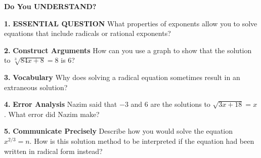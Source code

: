 \documentclass{article}
\newenvironment{practice}[2]{\noindent\textbf{#1.}}{}
\begin{document}
\vspace{1em}

\begin{minipage}[t]{0.45\textwidth}
\textbf{\large Do You UNDERSTAND?}

\begin{practice}{1}{}
\textbf{ESSENTIAL QUESTION} What properties of exponents allow you to solve equations that include radicals or rational exponents?
\end{practice}

\begin{practice}{2}{}
\textbf{Construct Arguments} How can you use a graph to show that the solution to $\sqrt[3]{84x + 8} = 8$ is 6?
\end{practice}

\begin{practice}{3}{}
\textbf{Vocabulary} Why does solving a radical equation sometimes result in an extraneous solution?
\end{practice}

\begin{practice}{4}{}
\textbf{Error Analysis} Nazim said that $-3$ and $6$ are the solutions to $\sqrt{3x + 18} = x$. What error did Nazim make?
\end{practice}

\begin{practice}{5}{}
\textbf{Communicate Precisely} Describe how you would solve the equation $x^{2/3} = n$. How is this solution method to be interpreted if the equation had been written in radical form instead?
\end{practice}
\end{minipage}
\hfill
\end{document}
